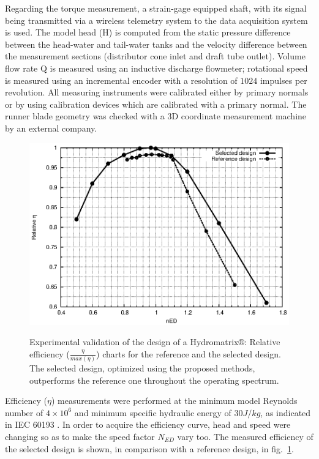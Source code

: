 Regarding the torque measurement, a strain-gage equipped shaft, with its signal being transmitted via a wireless telemetry system to the data acquisition system is used. The model head (H) is computed from the static pressure difference between the head-water and tail-water tanks and the velocity difference between the measurement sections (distributor cone inlet and draft tube outlet). Volume flow rate Q is measured using an inductive discharge flowmeter; rotational speed is measured using an incremental encoder with a resolution of $1024$ impulses per revolution. All measuring instruments were calibrated either by primary normals or by using calibration devices which are calibrated with a primary normal. The runner blade geometry was checked with a 3D coordinate measurement machine by an external company.

\begin{figure}[h!]
\centering
\resizebox*{13.0cm}{!}
{\includegraphics[width=1\textwidth]{./3obj6/Eff.eps}}
\caption{Experimental validation of the design of a Hydromatrix$\circledR$: Relative efficiency ($\frac{\eta}{max(\eta)}$) charts for the reference and the selected design. The selected design, optimized using the proposed  methods, outperforms the reference one throughout the operating spectrum.}
\label{exp.eff}
\end{figure}


Efficiency ($\eta$) measurements were performed at the minimum model Reynolds number of $4 × 10^6$ and minimum specific hydraulic energy of $30J/kg$, as indicated in IEC 60193 \cite{IEC}.
In order to acquire the efficiency curve, head and speed were changing so as to make the speed factor $N_{ED}$ vary too.  The measured efficiency of the selected design is shown, in comparison with a reference design, in fig.\ \ref{exp.eff}.    

